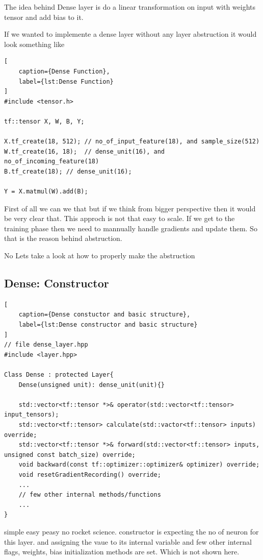 The idea behind Dense layer is do a linear transformation on
input with weights tensor and add bias to it.

If we wanted to implemente a dense layer without any layer
abstruction it would look something like


\begin{lstlisting}[
    caption={Dense Function},
    label={lst:Dense Function}
]
#include <tensor.h>

tf::tensor X, W, B, Y;

X.tf_create(18, 512); // no_of_input_feature(18), and sample_size(512)
W.tf_create(16, 18);  // dense_unit(16), and no_of_incoming_feature(18)
B.tf_create(18); // dense_unit(16);

Y = X.matmul(W).add(B);
\end{lstlisting}

First of all we can we that but if we think from bigger
perspective then it would be very clear that. This approch
is not that easy to scale. If we get to the training phase
then we need to mannually handle gradients and update them.
So that is the reason behind abstruction.

No Lets take a look at how to properly make the abstruction

\subsection{Dense: Constructor}

\begin{lstlisting}[
    caption={Dense constuctor and basic structure},
    label={lst:Dense constructor and basic structure}
]
// file dense_layer.hpp
#include <layer.hpp>

Class Dense : protected Layer{
    Dense(unsigned unit): dense_unit(unit){}

    std::vector<tf::tensor *>& operator(std::vector<tf::tensor> input_tensors);
    std::vector<tf::tensor> calculate(std::vactor<tf::tensor> inputs) override;
    std::vector<tf::tensor *>& forward(std::vector<tf::tensor> inputs, unsigned const batch_size) override;
    void backward(const tf::optimizer::optimizer& optimizer) override;
    void resetGradientRecording() override;
    ...
    // few other internal methods/functions
    ...
}
\end{lstlisting}

simple easy peasy no rocket science. constructor
is expecting the no of neuron for this layer.
and assigning the vaue to its internal variable
and few other internal flags, weights, bias initialization
methods are set. Which is not shown here.

